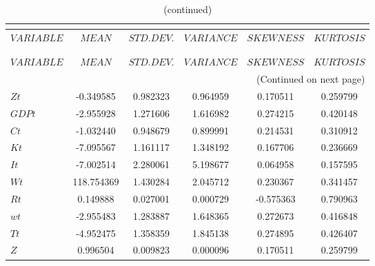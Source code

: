  
\begin{center}
\begin{longtable}{lccccc} 
\caption{MOMENTS OF SIMULATED VARIABLES}\\
 \label{Table:sim_moments}\\
\toprule 
$VARIABLE  $	 & 	 $            MEAN$	 & 	 $       STD. DEV.$	 & 	 $        VARIANCE$	 & 	 $        SKEWNESS$	 & 	 $        KURTOSIS$\\
\midrule \endfirsthead 
\caption{(continued)}\\
 \toprule \\ 
$VARIABLE  $	 & 	 $            MEAN$	 & 	 $       STD. DEV.$	 & 	 $        VARIANCE$	 & 	 $        SKEWNESS$	 & 	 $        KURTOSIS$\\
\midrule \endhead 
\midrule \multicolumn{6}{r}{(Continued on next page)} \\ \bottomrule \endfoot 
\bottomrule \endlastfoot 
$Zt        $	 & 	       -0.349585	 & 	        0.982323	 & 	        0.964959	 & 	        0.170511	 & 	        0.259799 \\ 
$GDPt      $	 & 	       -2.955928	 & 	        1.271606	 & 	        1.616982	 & 	        0.274215	 & 	        0.420148 \\ 
$Ct        $	 & 	       -1.032440	 & 	        0.948679	 & 	        0.899991	 & 	        0.214531	 & 	        0.310912 \\ 
$Kt        $	 & 	       -7.095567	 & 	        1.161117	 & 	        1.348192	 & 	        0.167706	 & 	        0.236669 \\ 
$It        $	 & 	       -7.002514	 & 	        2.280061	 & 	        5.198677	 & 	        0.064958	 & 	        0.157595 \\ 
$Wt        $	 & 	      118.754369	 & 	        1.430284	 & 	        2.045712	 & 	        0.230367	 & 	        0.341457 \\ 
$Rt        $	 & 	        0.149888	 & 	        0.027001	 & 	        0.000729	 & 	       -0.575363	 & 	        0.790963 \\ 
$wt        $	 & 	       -2.955483	 & 	        1.283887	 & 	        1.648365	 & 	        0.272673	 & 	        0.416848 \\ 
$Tt        $	 & 	       -4.952475	 & 	        1.358359	 & 	        1.845138	 & 	        0.274895	 & 	        0.426407 \\ 
$Z         $	 & 	        0.996504	 & 	        0.009823	 & 	        0.000096	 & 	        0.170511	 & 	        0.259799 \\ 

\end{longtable}
\end{center}
